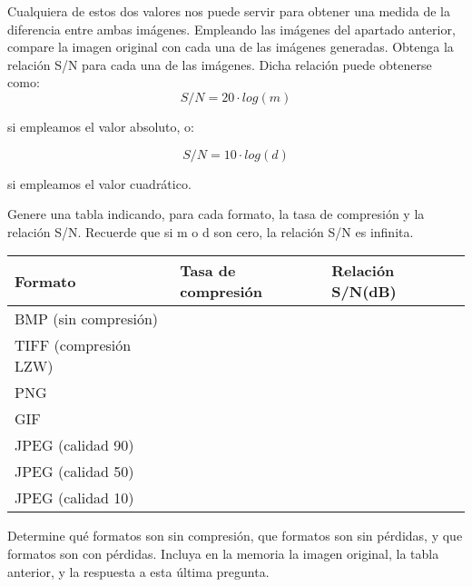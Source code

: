 \documentclass[es,practica]{uah}
\begin{document}
Cualquiera de estos dos valores nos puede servir para obtener una medida de la diferencia entre ambas imágenes. Empleando las imágenes del apartado anterior, compare la imagen original con cada una de las imágenes generadas. Obtenga la relación S/N para cada una de las imágenes. Dicha relación puede obtenerse como:
\begin{displaymath}
	S/N = 20 \cdot log(m)
\end{displaymath}

si empleamos el valor absoluto, o:

\begin{displaymath}
	S/N = 10 \cdot log(d)
\end{displaymath}

si empleamos el valor cuadrático.

Genere una tabla indicando, para cada formato, la tasa de compresión y la relación S/N. Recuerde que si m o d son cero, la relación S/N es infinita.

\begin{center}

\begin{tabular}{|l|l|l|}
\hline
{\bf Formato} & {\bf Tasa de compresión} & {\bf Relación S/N(dB)} \\
\hline	
BMP (sin compresión) & & \\
\hline	
TIFF (compresión LZW) & & \\
\hline	
PNG & & \\
\hline	
GIF & & \\
\hline	
JPEG (calidad 90) & & \\
\hline	
JPEG (calidad 50) & & \\
\hline	
JPEG (calidad 10) & & \\
\hline	
\end{tabular}
\end{center}

Determine qué formatos son sin compresión, que formatos son sin pérdidas, y que formatos son con pérdidas. Incluya en la memoria la imagen original, la tabla anterior, y la respuesta a esta última pregunta.
\end{document}
